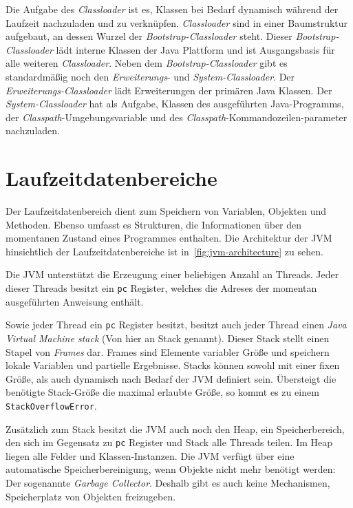 Die Aufgabe des \textit{Classloader} ist es, Klassen bei Bedarf dynamisch während der Laufzeit nachzuladen und zu verknüpfen. \textit{Classloader} sind in einer Baumstruktur aufgebaut, an dessen Wurzel der \textit{Bootstrap-Classloader} steht. Dieser \textit{Bootstrap-Classloader} lädt interne Klassen der Java Plattform und ist Ausgangsbasis für alle weiteren \textit{Classloader}. Neben dem \textit{Bootstrap-Classloader} gibt es standardmäßig noch den \textit{Erweiterungs}- und \textit{System-Classloader}. Der \textit{Erweiterungs-Classloader} lädt Erweiterungen der primären Java Klassen. Der \textit{System-Classloader} hat als Aufgabe, Klassen des ausgeführten Java-Programms, der \textit{Classpath}-Umgebungsvariable und des \textit{Classpath}-Kommandozeilen\break-parameter nachzuladen.

\section{Laufzeitdatenbereiche}

Der Laufzeitdatenbereich dient zum Speichern von Variablen, Objekten und Methoden. Ebenso umfasst es Strukturen, die Informationen über den momentanen Zustand eines Programmes enthalten. Die Architektur der JVM hinsichtlich der Laufzeitdatenbereiche ist in~\autoref{fig:jvm-architecture} zu sehen.

Die JVM unterstützt die Erzeugung einer beliebigen Anzahl an Threads. Jeder dieser Threads besitzt ein \texttt{pc} Register, welches die Adreses der momentan ausgeführten Anweisung enthält.

Sowie jeder Thread ein \texttt{pc} Register besitzt, besitzt auch jeder Thread einen \textit{Java Virtual Machine stack} (Von hier an Stack genannt). Dieser Stack stellt einen Stapel von \textit{Frames} dar. Frames sind Elemente variabler Größe und speichern lokale Variablen und partielle Ergebnisse. Stacks können sowohl mit einer fixen Größe, als auch dynamisch nach Bedarf der JVM definiert sein. Übersteigt die benötigte Stack-Größe die maximal erlaubte Größe, so kommt es zu einem \texttt{StackOverflowError}.

Zusätzlich zum Stack besitzt die JVM auch noch den Heap, ein Speicherbereich, den sich im Gegensatz zu \texttt{pc} Register und Stack alle Threads teilen. Im Heap liegen alle Felder und Klassen-Instanzen. Die JVM verfügt über eine automatische Speicherbereinigung, wenn Objekte nicht mehr benötigt werden: Der sogenannte \textit{Garbage Collector}. Deshalb gibt es auch keine Mechanismen, Speicherplatz von Objekten freizugeben.


